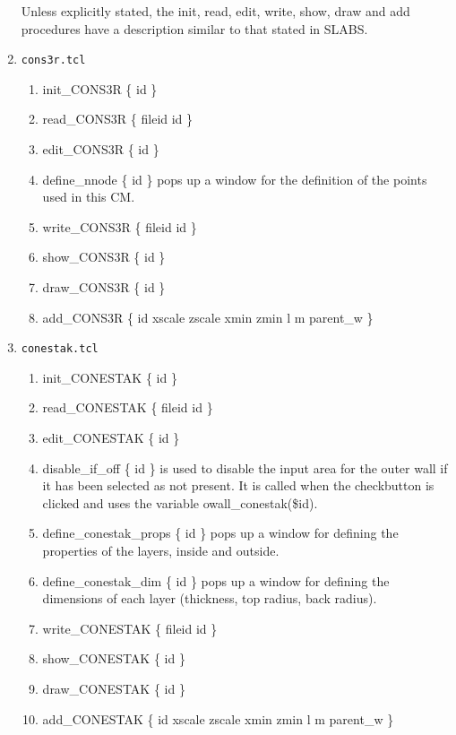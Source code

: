\documentclass[12pt]{book}
\begin{document}
\begin{enumerate}
Unless explicitly stated, the init, read, edit, write, show, draw and
add procedures have
a description similar to that stated in SLABS.

\item {\tt cons3r.tcl}
\begin{enumerate}
\item {\sf init\_CONS3R \{ id \}}
\item {\sf read\_CONS3R \{ fileid id \}}
\item {\sf edit\_CONS3R \{ id \}}
\item {\sf define\_nnode \{ id \}} pops up a window for the definition
of the points used in this CM.
\item {\sf write\_CONS3R \{ fileid id \}}
\item {\sf show\_CONS3R \{ id \}}
\item {\sf draw\_CONS3R \{ id \}}
\item {\sf add\_CONS3R \{ id xscale zscale xmin zmin l m parent\_w \}}
\end{enumerate}

\item {\tt conestak.tcl}
\begin{enumerate}
\item {\sf init\_CONESTAK \{ id \}}
\item {\sf read\_CONESTAK \{ fileid id \}}
\item {\sf edit\_CONESTAK \{ id \}}
\item {\sf disable\_if\_off \{ id \}} is used to disable the input area for the
outer wall if it has been selected as not present.  It is called when
the checkbutton is clicked and uses the variable owall\_conestak(\$id).
\item {\sf define\_conestak\_props \{ id \}} pops up a window for
defining the properties of the layers, inside and outside.
\item {\sf define\_conestak\_dim \{ id \}} pops up a window for defining
the dimensions of each layer (thickness, top radius, back radius).
\item {\sf write\_CONESTAK \{ fileid id \}}
\item {\sf show\_CONESTAK \{ id \}}
\item {\sf draw\_CONESTAK \{ id \}}
\item {\sf add\_CONESTAK \{ id xscale zscale xmin zmin l m parent\_w \}}
\end{enumerate}


\end{enumerate}
\end{document}
